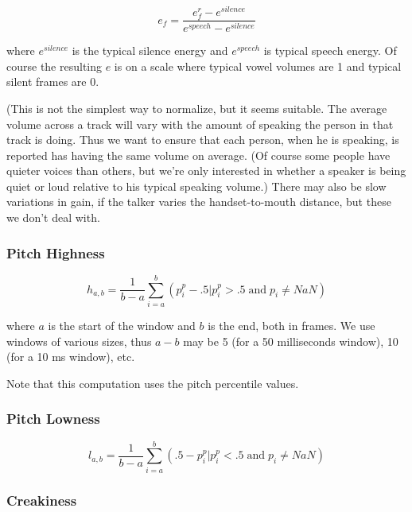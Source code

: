 \documentclass[11pt]{article}
\begin{document}
\begin{equation}
e_f = \frac{ e_f^r - e^{silence} }{e^{speech} - e ^{silence}}
\end{equation}

where $e^{silence}$ is the typical silence energy and $e^{speech}$ is
typical speech energy.  Of course the resulting $e$ is on a scale
where typical vowel volumes are 1 and typical silent frames are 0.

(This is not the simplest way to normalize, but it seems suitable.
The average volume across a track will vary with the amount of
speaking the person in that track is doing.  Thus we want to ensure
that each person, when he is speaking, is reported has having the same
volume on average.  (Of course some people have quieter voices than
others, but we're only interested in whether a speaker is being quiet
or loud relative to his typical speaking volume.)  There may also be
slow variations in gain, if the talker varies the handset-to-mouth
distance, but these we don't deal with.

\subsubsection{Pitch Highness}

\begin{equation}
h_{a,b} = \frac{1}{b-a} \sum\limits_{i=a}^b (p_i^p -.5 | p_i^p> .5 \operatorname{and} p_i \neq NaN)
\end{equation}

where $a$ is the start of the window and $b$ is the end, both in
frames.  We use windows of various sizes, thus $a-b$ may be 5 (for a
50 milliseconds window), 10 (for a 10 ms window), etc.

Note that this computation uses the pitch
percentile values.



\subsubsection{Pitch Lowness}

\begin{equation}
l_{a,b} = \frac{1}{b-a} \sum\limits_{i=a}^b ( .5 - p_i^p | p_i^p < .5 \operatorname{and} p_i \neq NaN)
\end{equation}

\subsubsection{Creakiness}
\end{document}
